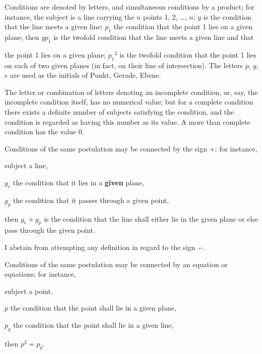 \documentclass[11pt,a4paper]{book}
\begin{document}
Conditions are denoted by letters, and simultaneous conditions by a product; for instance, the subject is a line carrying the $n$ points 1, 2, \ldots, $n$; $g$ is the condition that the line meets a given line; $p_1$ the condition that the point 1 lies on a given plane; then $gp_1$ is the twofold condition that the line meets a given line and that

\newpage
\noindent the point 1 lies on a given plane; ${p_1}^2$ is the twofold condition that the point 1 lies on each of two given planes (in fact, on their line of intersection). The letters $p$, $g$, $e$ are used as the initials of Punkt, Gerade, Ebene.

The letter or combination of letters denoting an incomplete condition, or, say, the incomplete condition itself, has no numerical value; but for a complete condition there exists a definite number of subjects satisfying the condition, and the condition is regarded as having this number as its value. A more than complete condition has the value 0.

Conditions of the same postulation may be connected by the sign $+$; for instance,

\hspace*{2em} subject a line,

\hspace*{2em} $g_e$ the condition that it lies in a \textbf{given} plane,

\hspace*{2em} $g_p$ the condition that it passes through a given point,

\hspace*{2em} then $g_e + g_p$ is the condition that the line shall either lie in the given plane or else pass through the given point.

I abstain from attempting any definition in regard to the sign $-$.

Conditions of the same postulation may be connected by an equation or equations; for instance,

\hspace*{2em} subject a point,

\hspace*{2em} $p$ the condition that the point shall lie in a given plane,

\hspace*{2em} $p_g$ the condition that the point shall lie in a given line,

\hspace*{2em} then $p^2 = p_g$.
\end{document}
